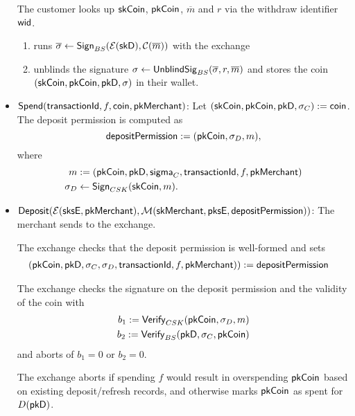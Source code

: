 \begin{itemize}
    The customer looks up $\mathsf{skCoin}$, $\mathsf{pkCoin}$,  $\overline{m}$
    and $r$ via the withdraw identifier $\mathsf{wid}$.

    \begin{enumerate}
      \item {} runs $\overline{\sigma} \leftarrow \mathsf{Sign}_{BS}(\mathcal{E}(\mathsf{skD}), \mathcal{C}(\overline{m}))$ with the exchange
      \item {} unblinds the signature $\sigma \leftarrow \mathsf{UnblindSig}_{BS}(\overline{\sigma}, r, \overline{m})$
        and stores the coin $(\mathsf{skCoin}, \mathsf{pkCoin}, \mathsf{pkD}, \sigma)$ in their wallet.
    \end{enumerate}

  \item $\mathsf{Spend}(\mathsf{transactionId}, f, \mathsf{coin}, \mathsf{pkMerchant})$:
    Let $(\mathsf{skCoin}, \mathsf{pkCoin}, \mathsf{pkD}, \sigma_C) := \mathsf{coin}$.
    The deposit permission is computed as
    \begin{equation*}
      \mathsf{depositPermission} := (\mathsf{pkCoin}, \sigma_D, m),
    \end{equation*}
    where
    \begin{align*}
      m &:= (\mathsf{pkCoin}, \mathsf{pkD}, \mathsf{sigma}_C, \mathsf{transactionId}, f, \mathsf{pkMerchant}) \\
      \sigma_D &\leftarrow \mathsf{Sign}_{CSK}(\mathsf{skCoin}, m).
    \end{align*}

  \item $\mathsf{Deposit}(\mathcal{E}(\mathsf{sksE}, \mathsf{pkMerchant}), \mathcal{M}(\mathsf{skMerchant}, \mathsf{pksE}, \mathsf{depositPermission}))$:
    The merchant sends  to the exchange.

    The exchange checks that the deposit permission is well-formed and sets
    \begin{align*}
      (\mathsf{pkCoin}, \mathsf{pkD}, \sigma_C, \sigma_D, \mathsf{transactionId}, f, \mathsf{pkMerchant})) &:= \mathsf{depositPermission}
    \end{align*}

    The exchange checks the signature on the deposit permission and the validity of the coin with
    \begin{align*}
      b_1 := \mathsf{Verify}_{CSK}(\mathsf{pkCoin}, \sigma_D, m) \\
      b_2 := \mathsf{Verify}_{BS}(\mathsf{pkD}, \sigma_C, \mathsf{pkCoin})
    \end{align*}
    and aborts of $b_1 = 0$ or $b_2=0$.

    The exchange aborts if spending $f$ would result in overspending
    $\mathsf{pkCoin}$ based on existing deposit/refresh records, and otherwise marks
    $\mathsf{pkCoin}$ as spent for $D(\mathsf{pkD})$.


\end{itemize}
